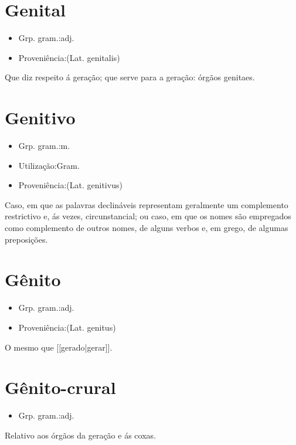 \section{Genital}
\begin{itemize}
\item {Grp. gram.:adj.}
\end{itemize}
\begin{itemize}
\item {Proveniência:(Lat. \textunderscore genitalis\textunderscore )}
\end{itemize}
Que diz respeito á geração; que serve para a geração: \textunderscore órgãos genitaes\textunderscore .
\section{Genitivo}
\begin{itemize}
\item {Grp. gram.:m.}
\end{itemize}
\begin{itemize}
\item {Utilização:Gram.}
\end{itemize}
\begin{itemize}
\item {Proveniência:(Lat. \textunderscore genitivus\textunderscore )}
\end{itemize}
Caso, em que as palavras declináveis representam geralmente um complemento restrictivo e, ás vezes, circunstancial; ou caso, em que os nomes são empregados como complemento de outros nomes, de alguns verbos e, em grego, de algumas preposições.
\section{Gênito}
\begin{itemize}
\item {Grp. gram.:adj.}
\end{itemize}
\begin{itemize}
\item {Proveniência:(Lat. \textunderscore genitus\textunderscore )}
\end{itemize}
O mesmo que [[gerado|gerar]].
\section{Gênito-crural}
\begin{itemize}
\item {Grp. gram.:adj.}
\end{itemize}
Relativo aos órgãos da geração e ás coxas.
